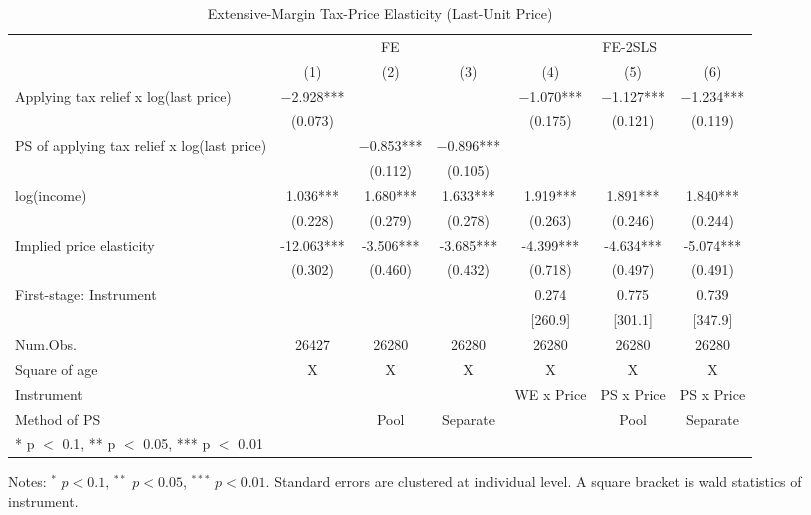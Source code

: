 \documentclass[
  11pt,
  a4paper,
]{article}
\begin{document}
\begin{table}[!h]

\caption{\label{tab:LastExtensive}Extensive-Margin Tax-Price Elasticity (Last-Unit Price)}
\centering
\fontsize{8}{10}\selectfont
\begin{threeparttable}
\begin{tabular}[t]{lcccccc}
\toprule
\multicolumn{1}{c}{ } & \multicolumn{3}{c}{FE} & \multicolumn{3}{c}{FE-2SLS} \\
\cmidrule(l{3pt}r{3pt}){2-4} \cmidrule(l{3pt}r{3pt}){5-7}
  & (1) & (2) & (3) & (4) & (5) & (6)\\
\midrule
Applying tax relief x log(last price) & \num{-2.928}*** &  &  & \num{-1.070}*** & \num{-1.127}*** & \num{-1.234}***\\
 & (\num{0.073}) &  &  & (\num{0.175}) & (\num{0.121}) & (\num{0.119})\\
PS of applying tax relief x log(last price) &  & \num{-0.853}*** & \num{-0.896}*** &  &  & \\
 &  & (\num{0.112}) & (\num{0.105}) &  &  & \\
log(income) & \num{1.036}*** & \num{1.680}*** & \num{1.633}*** & \num{1.919}*** & \num{1.891}*** & \num{1.840}***\\
 & (\num{0.228}) & (\num{0.279}) & (\num{0.278}) & (\num{0.263}) & (\num{0.246}) & (\num{0.244})\\
\midrule
Implied price elasticity & -12.063*** & -3.506*** & -3.685*** & -4.399*** & -4.634*** & -5.074***\\
 & (0.302) & (0.460) & (0.432) & (0.718) & (0.497) & (0.491)\\
First-stage: Instrument &  &  &  & 0.274 & 0.775 & 0.739\\
 &  &  &  & [260.9] & [301.1] & [347.9]\\
Num.Obs. & \num{26427} & \num{26280} & \num{26280} & \num{26280} & \num{26280} & \num{26280}\\
Square of age & X & X & X & X & X & X\\
Instrument &  &  &  & WE x Price & PS x Price & PS x Price\\
Method of PS &  & Pool & Separate &  & Pool & Separate\\
\bottomrule
\multicolumn{7}{l}{\rule{0pt}{1em}* p $<$ 0.1, ** p $<$ 0.05, *** p $<$ 0.01}\\
\end{tabular}
\begin{tablenotes}
\item Notes: $^{*}$ $p < 0.1$, $^{**}$ $p < 0.05$, $^{***}$ $p < 0.01$. Standard errors are clustered at individual level. A square bracket is wald statistics of instrument.
\end{tablenotes}
\end{threeparttable}
\end{table}
\end{document}
